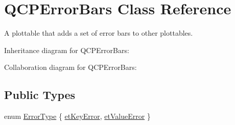 \hypertarget{classQCPErrorBars}{}\section{Q\+C\+P\+Error\+Bars Class Reference}
\label{classQCPErrorBars}


A plottable that adds a set of error bars to other plottables.  




Inheritance diagram for Q\+C\+P\+Error\+Bars\+:


Collaboration diagram for Q\+C\+P\+Error\+Bars\+:
\subsection*{Public Types}
\begin{DoxyCompactItemize}
\item 
enum \hyperlink{classQCPErrorBars_a95f0220f11a72648b96480a85ce26474}{Error\+Type} \{ \hyperlink{classQCPErrorBars_a95f0220f11a72648b96480a85ce26474a9fca24d20d5376e41be216fc9b08cd21}{et\+Key\+Error}, 
\hyperlink{classQCPErrorBars_a95f0220f11a72648b96480a85ce26474a5f760fc9c0a98c7f1e93e33bf54e9d83}{et\+Value\+Error}
 \}
\end{DoxyCompactItemize}
